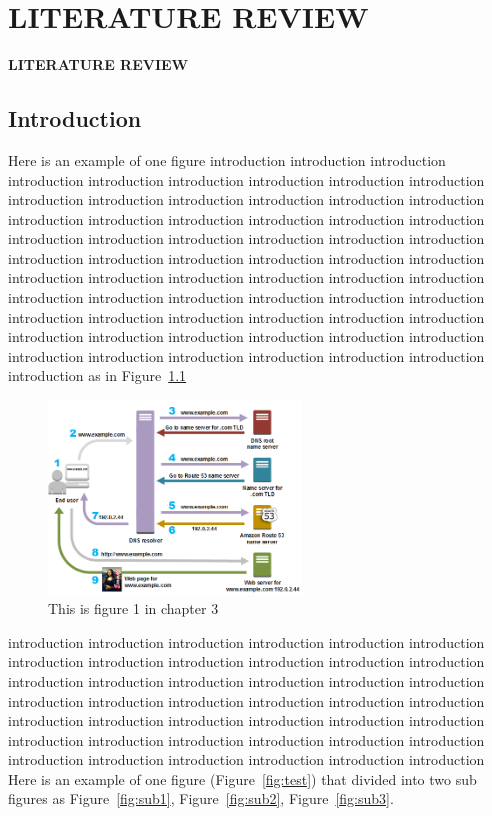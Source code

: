 \chapter{LITERATURE REVIEW}
\pagebreak

\begin{center}
{\LARGE\textbf{LITERATURE REVIEW}}
\end{center}

\section{Introduction}
Here is an example of one figure introduction introduction introduction introduction introduction introduction introduction introduction introduction introduction introduction introduction introduction introduction introduction introduction introduction introduction introduction introduction introduction introduction introduction introduction introduction introduction introduction introduction introduction introduction introduction introduction introduction introduction introduction introduction introduction introduction introduction introduction introduction introduction introduction introduction introduction introduction introduction introduction introduction introduction introduction introduction introduction introduction introduction introduction introduction introduction introduction introduction introduction introduction introduction introduction as in Figure~\ref{f11}


\begin{figure}[ht]
\begin{center}
\includegraphics[width=0.6\textwidth]{figures/samples/Fig1.png}
\caption{This is figure 1 in chapter 3}
\label{f11}
\end{center}
\end{figure}

introduction introduction introduction introduction introduction introduction introduction introduction introduction introduction introduction introduction introduction introduction introduction introduction introduction introduction introduction introduction introduction introduction introduction introduction introduction introduction introduction introduction introduction introduction introduction introduction introduction introduction introduction introduction introduction introduction introduction introduction introduction introduction Here is an example of one figure (Figure~\ref{fig:test}) that divided into two sub figures as Figure~\ref{fig:sub1}, Figure~\ref{fig:sub2}, Figure~\ref{fig:sub3}.

